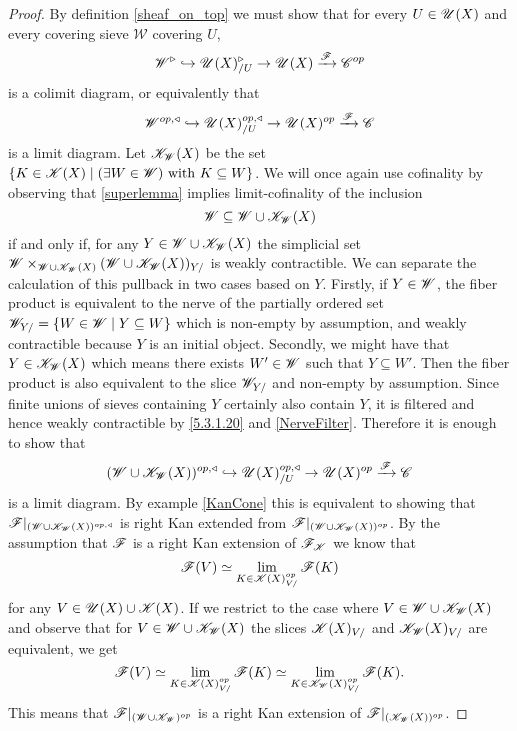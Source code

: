 \documentclass[../../thesis.tex]{subfiles}
\begin{document}
\begin{proof}
    By definition \ref{sheaf_on_top} we must show that for every $U\in \mathscr{U}(X)$ and every covering sieve $\mathscr{W}$ covering $U$,
    \[
        \mathscr{W}^{\triangleright} \hookrightarrow \mathscr{U}(X)_{/U}^{\triangleright} \rightarrow \mathscr{U}(X)\xrightarrow{\mathscr{F}}\mathscr{C}^{op}
    \]
    is a colimit diagram, or equivalently that
    \[
        \mathscr{W}^{op,\triangleleft} \hookrightarrow \mathscr{U}(X)_{/U}^{op,\triangleleft} \rightarrow \mathscr{U}(X)^{op}\xrightarrow{\mathscr{F}}\mathscr{C}
    \]
    is a limit diagram.
    Let $\mathscr{K}_{\mathscr{W}}(X)$ be the set $\{K\in \mathscr{K}(X) \mid (\exists W \in \mathscr{W}) \text{ with }K \subseteq W \}$.
    We will once again use cofinality by observing that \ref{superlemma} implies  limit-cofinality of the inclusion
    \[
        \mathscr{W} \subseteq \mathscr{W} \cup \mathscr{K}_{\mathscr{W}}(X)
    \]
    if and only if, for any $Y \in \mathscr{W} \cup \mathscr{K}_{\mathscr{W}}(X)$ the simplicial set $\mathscr{W}\times_{\mathscr{W} \cup \mathscr{K}_{\mathscr{W}}(X)}(\mathscr{W} \cup \mathscr{K}_{\mathscr{W}}(X))_{Y/}$ is weakly contractible.
    We can separate the calculation of this pullback in two cases based on $Y$.
    Firstly, if $Y\in \mathscr{W}$, the fiber product is equivalent to the nerve of the partially ordered set $\mathscr{W}_{Y/}=\{W \in \mathscr{W} \mid Y \subseteq W\}$ which is non-empty by assumption, and weakly contractible because $Y$ is an initial object.
    Secondly, we might have that $Y \in \mathscr{K}_{\mathscr{W}}(X)$ which means there exists $W'\in \mathscr{W}$ such that $Y \subseteq W'$.
    Then the fiber product is also equivalent to the slice $\mathscr{W}_{Y/}$ and non-empty by assumption.
    Since finite unions of sieves containing $Y$ certainly also contain $Y$, it is filtered and hence weakly contractible by \ref{5.3.1.20} and \ref{NerveFilter}.
    Therefore it is enough to show that
    \[
        (\mathscr{W} \cup \mathscr{K}_{\mathscr{W}}(X))^{op,\triangleleft} \hookrightarrow \mathscr{U}(X)_{/U}^{op,\triangleleft} \rightarrow \mathscr{U}(X)^{op}\xrightarrow{\mathscr{F}}\mathscr{C}
    \]
    is a limit diagram.
    By example \ref{KanCone} this is equivalent to showing that $\mathscr{F}|_{(\mathscr{W} \cup \mathscr{K}_{\mathscr{W}}(X))^{op,\triangleleft}}$ is right Kan extended from $\mathscr{F}|_{(\mathscr{W} \cup \mathscr{K}_{\mathscr{W}}(X))^{op}}$.
    By the assumption that $\mathscr{F}$ is a right Kan extension of $\mathscr{F}_{\mathscr{K}}$ we know that
    \[
        \mathscr{F}(V)  \simeq \lim_{K\in \mathscr{K}(X)_{V/}^{op}} \mathscr{F}(K)
    \]
    for any $V \in \mathscr{U}(X) \cup \mathscr{K}(X)$.
    If we restrict to the case where $V \in \mathscr{W} \cup \mathscr{K}_{\mathscr{W}}(X)$ and observe that for $V\in \mathscr{W} \cup \mathscr{K}_{\mathscr{W}}(X)$ the slices $ \mathscr{K}(X)_{V/}$ and $ \mathscr{K}_{\mathscr{W}}(X)_{V/}$ are equivalent, we get
    \[
        \mathscr{F}(V) \simeq \lim_{K\in \mathscr{K}(X)_{V/}^{op}} \mathscr{F}(K) \simeq \lim_{K\in \mathscr{K}_{\mathscr{W}}(X)_{V/}^{op}} \mathscr{F}(K).
    \]
    This means that $\mathscr{F}|_{(\mathscr{W} \cup \mathscr{K}_{\mathscr{W}})^{op}}$ is a right Kan extension of $\mathscr{F}|_{(\mathscr{K}_{\mathscr{W}}(X))^{op}}$.

\end{proof}
\end{document}
